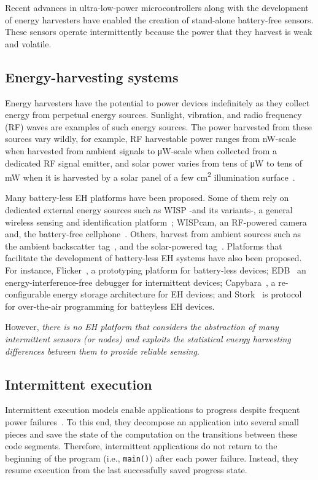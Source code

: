 Recent advances in ultra-low-power microcontrollers along with the development of energy harvesters have enabled the creation of stand-alone battery-free sensors. These sensors operate intermittently because the power that they harvest is
weak and volatile.

\subsection{Energy-harvesting systems}
Energy harvesters have the potential to power devices indefinitely as they collect energy from perpetual energy sources. Sunlight, vibration, and radio frequency (RF) waves are examples of such energy sources. The power harvested from these sources vary wildly, for example, RF harvestable power ranges from
\si{\nano\watt}-scale when harvested from ambient signals to \si{\uW}-scale when collected from a dedicated RF signal emitter, and solar power varies from tens of \si{\uW} to tens of \si{\mW} when it is harvested by a solar panel of a few \si{\cm^2} illumination surface~\cite{lucia2017intermittent,rao2017ambient}.

Many battery-less EH platforms have been proposed. Some of them
rely on dedicated external energy sources such as WISP -and its variants-, a
general wireless sensing and identification
platform~\cite{smith2006wirelessly,zhao2015nfc,zhang2011moo}; WISPcam,  an
RF-powered camera~\cite{naderiparizi2015wispcam} and, the battery-free
cellphone~\cite{talla2017battery}. Others, harvest from ambient sources such as
the ambient backscatter tag~\cite{liu2013ambient}, and the solar-powered
tag~\cite{majid2019multi}. Platforms that facilitate the development of
battery-less EH systems have also been proposed. For instance,
Flicker~\cite{hester2017flicker}, a prototyping platform for battery-less devices; EDB~\cite{colin2016energy} an energy-interference-free debugger for intermittent devices; Capybara~\cite{colin2018reconfigurable}, a re-configurable energy storage architecture for EH devices; and Stork~\cite{aantjes2017fast} is protocol for over-the-air programming for batteyless EH devices.

However, \emph{there is no EH platform that considers the abstraction of many intermittent sensors (or nodes) and exploits the statistical energy harvesting differences between them to provide reliable sensing}.


\subsection{Intermittent execution}
Intermittent execution models enable applications to progress despite frequent
power failures~\cite{van2016intermittent,colin2016chain,lucia2015simpler,bhatti2017harvos,gobieski2019intelligence,patoukas2018feasibility}. To this end, they decompose an application into several small pieces and save the state of the computation on the transitions between these code segments. Therefore, intermittent applications do not return to the beginning of the program (i.e., \texttt{main()}) after each power failure.
Instead, they resume execution from the last successfully saved progress state.   

